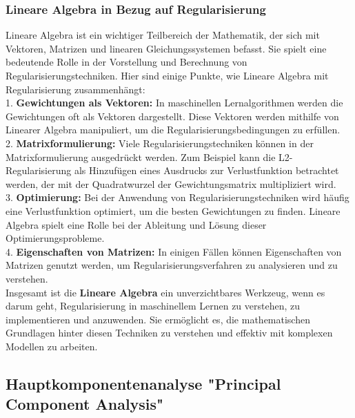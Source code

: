 \documentclass[12pt]{article}
\begin{document}
\subsubsection{Lineare Algebra in Bezug auf Regularisierung}
Lineare Algebra ist ein wichtiger Teilbereich der Mathematik, der sich mit Vektoren, Matrizen und linearen Gleichungssystemen befasst. Sie spielt eine bedeutende Rolle in der Vorstellung und Berechnung von Regularisierungstechniken. Hier sind einige Punkte, wie Lineare Algebra mit Regularisierung zusammenhängt:\\

1. \textbf{Gewichtungen als Vektoren:} In maschinellen Lernalgorithmen werden die Gewichtungen oft als Vektoren dargestellt. Diese Vektoren werden mithilfe von Linearer Algebra manipuliert, um die Regularisierungsbedingungen zu erfüllen.\\

2. \textbf{Matrixformulierung:} Viele Regularisierungstechniken können in der Matrixformulierung ausgedrückt werden. Zum Beispiel kann die L2-Regularisierung als Hinzufügen eines Ausdrucks zur Verlustfunktion betrachtet werden, der mit der Quadratwurzel der Gewichtungsmatrix multipliziert wird.\\

3. \textbf{Optimierung:} Bei der Anwendung von Regularisierungstechniken wird häufig eine Verlustfunktion optimiert, um die besten Gewichtungen zu finden. Lineare Algebra spielt eine Rolle bei der Ableitung und Lösung dieser Optimierungsprobleme.\\

4. \textbf{Eigenschaften von Matrizen:} In einigen Fällen können Eigenschaften von Matrizen genutzt werden, um Regularisierungsverfahren zu analysieren und zu verstehen.\\[0.15cm]

Insgesamt ist die \textbf{Lineare Algebra} ein unverzichtbares Werkzeug, wenn es darum geht, Regularisierung in maschinellem Lernen zu verstehen, zu implementieren und anzuwenden. Sie ermöglicht es, die mathematischen Grundlagen hinter diesen Techniken zu verstehen und effektiv mit komplexen Modellen zu arbeiten. \\

\newpage

\subsection{Hauptkomponentenanalyse "Principal Component Analysis"}
 
\end{document}
